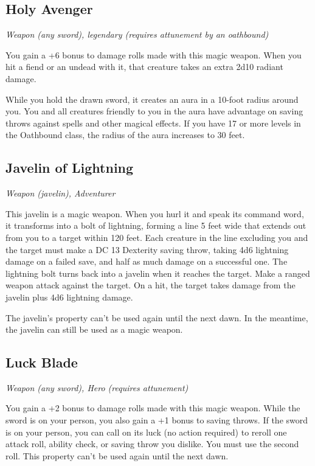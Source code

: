 \subsection{Holy Avenger}
\textit{Weapon (any sword), legendary (requires attunement by an oathbound)}

You gain a +6 bonus to damage rolls made with this magic weapon. When you hit a fiend or an undead with it, that creature takes an extra 2d10 radiant damage.

While you hold the drawn sword, it creates an aura in a 10-foot radius around you. You and all creatures friendly to you in the aura have advantage
on saving throws against spells and other magical effects. If you have 17 or more levels in the Oathbound class, the radius of the aura increases to 30 feet.

\subsection{Javelin of Lightning}
\textit{Weapon (javelin), Adventurer}

This javelin is a magic weapon. When you hurl it and speak its command word, it transforms into a bolt of lightning, forming a line 5 feet wide that extends out from you to a target within 120 feet. Each creature in the line excluding you and the target must make a DC 13 Dexterity saving throw, taking 4d6 lightning damage on a failed save, and half as much damage on a successful one. The lightning bolt turns back into a javelin when it reaches the target. Make a ranged weapon attack against the target. On a hit, the target takes damage from the javelin plus 4d6 lightning damage.

The javelin's property can't be used again until the next dawn. In the meantime, the javelin can still be used as a magic weapon.

\subsection{Luck Blade}
\textit{Weapon (any sword), Hero (requires attunement)}

You gain a +2 bonus to damage rolls made with this magic weapon. While the sword is on your person, you also gain a +1 bonus to saving throws. If the sword is on your person, you can call on its luck (no action required) to reroll one attack roll, ability check, or saving throw you dislike. You must use the second roll. This property can't be used again until the next dawn.

